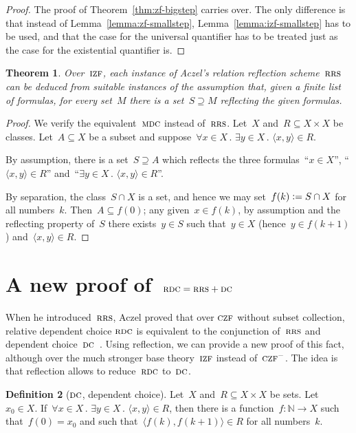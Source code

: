 \documentclass[oneside,reqno]{amsart}
\theoremstyle{definition}
\newtheorem{defn}{Definition}[section]
\theoremstyle{plain}
\newtheorem{thm}[defn]{Theorem}
\theoremstyle{remark}
\newcommand{\NN}{\mathbb{N}}
\newcommand{\defeq}{\vcentcolon=}
\renewcommand{\_}{\mathpunct{.}\,}
\newcommand{\?}{\,{:}\,}
\newcommand{\IZF}{\textsc{izf}}
\newcommand{\CZF}{\textsc{czf}}
\newcommand{\RRS}{\textsc{rrs}}
\newcommand{\RDC}{\textsc{rdc}}
\newcommand{\DC}{\textsc{dc}}
\newcommand{\MDC}{\textsc{mdc}}
\begin{document}
\begin{proof}The proof of Theorem~\ref{thm:zf-bigstep} carries over. The only
difference is that instead of Lemma~\ref{lemma:zf-smallstep},
Lemma~\ref{lemma:izf-smallstep} has to be used, and that the case for the
universal quantifier has to be treated just as the case for the existential
quantifier is.\end{proof}

\begin{thm}\label{thm:refl-entails-rrs}
Over~$\IZF$, each instance of Aczel's relation reflection scheme~$\RRS$ can be
deduced from suitable instances of the assumption that, given a finite list
of formulas, for every set~$M$ there is a set~$S \supseteq M$ reflecting the
given formulas.
\end{thm}

\begin{proof}We verify the equivalent~$\MDC$ instead of~$\RRS$. Let~$X$ and~$R
\subseteq X \times X$ be classes. Let~$A \subseteq X$ be a subset and
suppose~$\forall x \in X\_ \exists y \in X\_ \langle x,y \rangle \in R$.

By assumption, there is a set~$S \supseteq A$ which reflects the three
formulas~``$x \in X$'', ``$\langle x,y \rangle \in R$'' and~``$\exists y \in X\_ \langle
x,y \rangle \in R$''.

By separation, the class~$S \cap X$ is a set, and hence we may set~$f(k) \defeq S \cap X$
for all numbers~$k$. Then~$A \subseteq f(0)$; any given~$x \in f(k)$, by
assumption and the reflecting property of~$S$ there exists~$y \in S$ such
that~$y \in X$ (hence~$y \in f(k+1)$) and~$\langle x,y \rangle \in R$.
\end{proof}


\section{A new proof of~$\RDC = \RRS + \DC$}
\label{sect:appl-rdc}

When he introduced~$\RRS$, Aczel proved that over $\CZF$ without subset
collection, relative dependent choice $\RDC$ is equivalent to the conjunction
of~$\RRS$ and dependent choice~$\DC$~\cite[Theorem~2.4]{aczel:rrs}. Using
reflection, we can provide a new proof of this fact, although over the much
stronger base theory~$\IZF$ instead of~$\CZF^{-}$. The idea is that reflection
allows to reduce~$\RDC$ to~$\DC$.

\begin{defn}[$\DC$, dependent choice]
Let~$X$ and~$R \subseteq X \times X$ be sets. Let~$x_0 \in X$.
If~$\forall x \in X\_ \exists y \in X\_ \langle x,y \rangle \in R$,
then there is a function~$f : \NN \to X$ such that~$f(0) = x_0$ and
such that~$\langle f(k), f(k+1) \rangle \in R$ for all numbers~$k$.
\end{defn}
\end{document}
